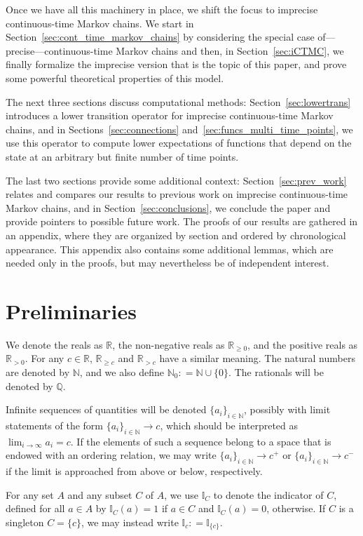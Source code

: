 \documentclass[10pt,a4paper]{paper}
\theoremstyle{definition}
\newcommand{\nats}{\mathbb{N}}
\newcommand{\reals}{\mathbb{R}}
\newcommand{\realspos}{\reals_{>0}}
\newcommand{\realsnonneg}{\reals_{\geq 0}}
\newcommand{\ind}[1]{\mathbb{I}_{#1}}
\newcommand{\coloneqq}{:\!=}
\begin{document}
Once we have all this machinery in place, we shift the focus to imprecise continuous-time Markov chains. We start in Section~\ref{sec:cont_time_markov_chains} by considering the special case of---precise---continuous-time Markov chains and then, in Section~\ref{sec:iCTMC}, we finally formalize the imprecise version that is the topic of this paper, and prove some powerful theoretical properties of this model.


The next three sections discuss computational methods: Section~\ref{sec:lowertrans} introduces a lower transition operator for imprecise continuous-time Markov chains, and in Sections~\ref{sec:connections} and~\ref{sec:funcs_multi_time_points}, we use this operator to compute lower expectations of functions that depend on the state at an arbitrary but finite number of time points. 

The last two sections provide some additional context: Section~\ref{sec:prev_work} relates and compares our results to previous work on imprecise continuous-time Markov chains, and in
Section~\ref{sec:conclusions}, we conclude the paper and provide pointers to possible future work. The proofs of our results are gathered in an appendix, where they are organized by section and ordered by chronological appearance. This appendix also contains some additional lemmas, which are needed only in the proofs, but may nevertheless be of independent interest.

\section{Preliminaries}\label{sec:prelim}

We denote the reals as $\reals$, the non-negative reals as $\realsnonneg$, and the positive reals as $\realspos$. For any $c\in\reals$, $\reals_{\geq c}$ and $\reals_{>c}$ have a similar meaning. The natural numbers are denoted by $\nats$, and we also define $\nats_0\coloneqq\nats\cup\{0\}$. The rationals will be denoted by $\mathbb{Q}$.

Infinite sequences of quantities will be denoted $\{a_i\}_{i\in\nats}$, possibly with limit statements of the form $\{a_i\}_{i\in\nats}\to c$, which should be interpreted as $\lim_{i\to\infty}a_i=c$. If the elements of such a sequence belong to a space that is endowed with an ordering relation, we may write $\{a_i\}_{i\in\nats}\to c^+$ or $\{a_i\}_{i\in\nats}\to c^-$ if the limit is approached from above or below, respectively.

For any set $A$ and any subset $C$ of $A$, we use $\ind{C}$ to denote the indicator of $C$, defined for all $a\in A$ by $\ind{C}(a)=1$ if $a\in C$ and $\ind{C}(a)=0$, otherwise. If $C$ is a singleton $C=\{c\}$, we may instead write $\ind{c}\coloneqq\ind{\{c\}}$.
\end{document}
